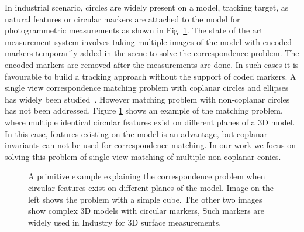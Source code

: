 \documentclass{bmvc2k}
\begin{document}
\par 
In industrial scenario, circles are widely present on a model, tracking target, as natural features or circular markers are attached to the model for photogrammetric measurements \cite{luhmann_close_2006} as shown in Fig. \ref{fig:introProblem}.
The state of the art measurement system involves taking multiple images of the model with encoded markers temporarily added in the scene to solve the correspondence problem. 
The encoded markers are removed after the measurements are done.  
In such cases it is favourable to build a tracking approach without the support of coded markers. 
A single view correspondence matching problem with coplanar circles and ellipses has widely been studied~\cite{lepetit_monocular_2005,forsyth_91,Ferri_1993}.
However matching problem with non-coplanar circles has not been addressed.
Figure \ref{fig:introProblem} shows an example of the matching problem, where multiple identical circular features exist on different planes of a 3D model.
In this case, features existing on the model is an advantage, but coplanar invariants can not be used for correspondence matching.
In our work we focus on solving this problem of single view matching of multiple non-coplanar conics.
\begin{figure}[tb]
\centering
\caption{A primitive example explaining the correspondence problem when circular features exist on different planes of the model. Image on the left shows the problem with a simple cube. The other two images show complex 3D models with circular markers, Such markers are widely used in Industry for 3D surface measurements. }

\label{fig:introProblem}
\end{figure}
\end{document}
